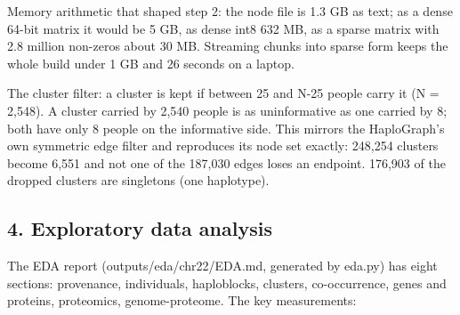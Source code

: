 \documentclass[11pt,a4paper]{article}
\begin{document}
Memory arithmetic that shaped step 2: the node file is 1.3 GB as text; as a dense 64-bit matrix it would be 5 GB, as dense int8 632 MB, as a sparse matrix with 2.8 million non-zeros about 30 MB. Streaming chunks into sparse form keeps the whole build under 1 GB and 26 seconds on a laptop.

The cluster filter: a cluster is kept if between 25 and N-25 people carry it (N = 2,548). A cluster carried by 2,540 people is as uninformative as one carried by 8; both have only 8 people on the informative side. This mirrors the HaploGraph's own symmetric edge filter and reproduces its node set exactly: 248,254 clusters become 6,551 and not one of the 187,030 edges loses an endpoint. 176,903 of the dropped clusters are singletons (one haplotype).

\subsection{4. Exploratory data analysis}

The EDA report (outputs/eda/chr22/EDA.md, generated by eda.py) has eight sections: provenance, individuals, haploblocks, clusters, co-occurrence, genes and proteins, proteomics, genome-proteome. The key measurements:
\end{document}
